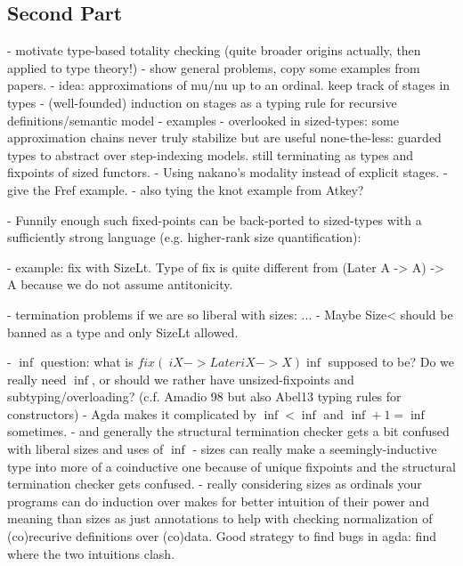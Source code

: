 \documentclass{article}
\begin{document}
\subsection{Second Part}
- motivate type-based totality checking (quite broader origins actually, then applied to type theory!)
  - show general problems, copy some examples from papers.
  - idea: approximations of mu/nu up to an ordinal. keep track of stages in types
  - (well-founded) induction on stages as a typing rule for recursive definitions/semantic model
    - examples 
  - overlooked in sized-types: some approximation chains never truly
  stabilize but are useful none-the-less: guarded types to abstract
  over step-indexing models. still terminating as types and fixpoints of sized functors.
  - Using nakano's modality instead of explicit stages.
    - give the Fref example.
    - also tying the knot example from Atkey?

  - Funnily enough such fixed-points can be back-ported to
    sized-types with a sufficiently strong language (e.g. higher-rank
    size quantification):
    
    - example: fix with SizeLt. Type of fix is quite different from
    (Later A -> A) -> A because we do not assume antitonicity.

    - termination problems if we are so liberal with sizes: ...
      - Maybe Size< should be banned as a type and only SizeLt allowed.

    - $\inf$ question: what is $fix (\ i X -> Later i X -> X) \inf$
    supposed to be? Do we really need $\inf$, or should we rather have
    unsized-fixpoints and subtyping/overloading? (c.f. Amadio 98 but
    also Abel13 typing rules for constructors)
     - Agda makes it complicated by $\inf < \inf$ and $\inf + 1 = \inf$ sometimes.
     - and generally the structural termination checker gets a bit confused with liberal sizes and uses of $\inf$
         - sizes can really make a seemingly-inductive type into more of a
         coinductive one because of unique fixpoints and the structural
         termination checker gets confused.
         - really considering sizes as ordinals your programs can do
         induction over makes for better intuition of their power and meaning than sizes as just
         annotations to help with checking normalization of (co)recurive definitions over (co)data.
         Good strategy to find bugs in agda: find where the two intuitions clash.
\end{document}
